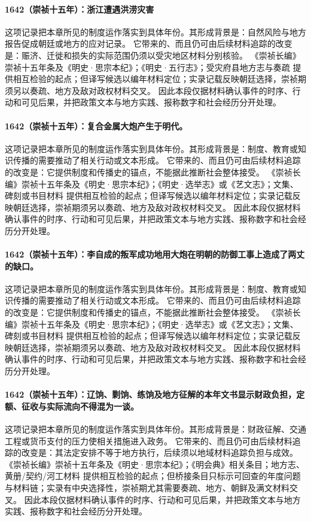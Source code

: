 \paragraph{1642（崇祯十五年）：浙江遭遇洪涝灾害} 这项记录把本章所见的制度运作落实到具体年份。其形成背景是：自然风险与地方报告促成朝廷或地方的应对记录。 它带来的、而且仍可由后续材料追踪的改变是：赈济、迁徙和损失的实际范围仍须以受灾地区材料分别核验。 《崇祯长编》崇祯十五年条及《明史·思宗本纪》；《明史·五行志》；受灾府县地方志与奏疏 提供相互检验的起点；但译写候选以编年材料定位；实录记载反映朝廷选择，崇祯期须另以奏疏、地方及敌对政权材料交叉。 因此本段仅据材料确认事件的时序、行动和可见后果，并把政策文本与地方实践、报称数字和社会经历分开处理。

\paragraph{1642（崇祯十五年）：复合金属大炮产生于明代。} 这项记录把本章所见的制度运作落实到具体年份。其形成背景是：制度、教育或知识传播的需要推动了相关行动或文本形成。 它带来的、而且仍可由后续材料追踪的改变是：它提供制度和传播史的锚点，不能据此推断社会整体接受。 《崇祯长编》崇祯十五年条及《明史·思宗本纪》；《明史·选举志》或《艺文志》；文集、碑刻或书目材料 提供相互检验的起点；但译写候选以编年材料定位；实录记载反映朝廷选择，崇祯期须另以奏疏、地方及敌对政权材料交叉。 因此本段仅据材料确认事件的时序、行动和可见后果，并把政策文本与地方实践、报称数字和社会经历分开处理。

\paragraph{1642（崇祯十五年）：李自成的叛军成功地用大炮在明朝的防御工事上造成了两丈的缺口。} 这项记录把本章所见的制度运作落实到具体年份。其形成背景是：制度、教育或知识传播的需要推动了相关行动或文本形成。 它带来的、而且仍可由后续材料追踪的改变是：它提供制度和传播史的锚点，不能据此推断社会整体接受。 《崇祯长编》崇祯十五年条及《明史·思宗本纪》；《明史·选举志》或《艺文志》；文集、碑刻或书目材料 提供相互检验的起点；但译写候选以编年材料定位；实录记载反映朝廷选择，崇祯期须另以奏疏、地方及敌对政权材料交叉。 因此本段仅据材料确认事件的时序、行动和可见后果，并把政策文本与地方实践、报称数字和社会经历分开处理。

\paragraph{1642（崇祯十五年）：辽饷、剿饷、练饷及地方征解的本年文书显示财政负担，定额、征收与实际流向不得混为一谈。} 这项记录把本章所见的制度运作落实到具体年份。其形成背景是：财政征解、交通工程或货币支付的压力使相关措施进入政务。 它带来的、而且仍可由后续材料追踪的改变是：其法定安排不等于地方执行，后续须以地域材料追踪负担与成效。 《崇祯长编》崇祯十五年条及《明史·思宗本纪》；《明会典》相关条目；地方志、黄册/契约/河工材料 提供相互检验的起点；但桥接条目只标示可回查的年度问题与材料链；实录有中央选择性，崇祯期尤其需要奏疏、地方、朝鲜及满文材料交叉。 因此本段仅据材料确认事件的时序、行动和可见后果，并把政策文本与地方实践、报称数字和社会经历分开处理。

